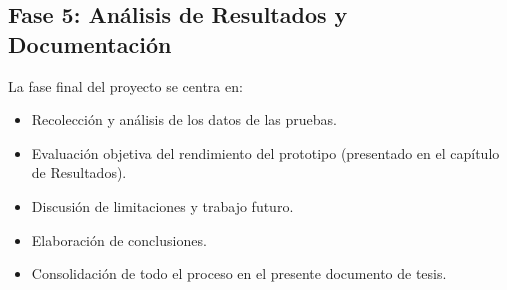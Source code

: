 \subsection{Fase 5: Análisis de Resultados y Documentación}
\label{subsec:met_fase5} 
La fase final del proyecto se centra en:
\begin{itemize}
    \item Recolección y análisis de los datos de las pruebas.
    \item Evaluación objetiva del rendimiento del prototipo (presentado en el capítulo de Resultados).
    \item Discusión de limitaciones y trabajo futuro.
    \item Elaboración de conclusiones.
    \item Consolidación de todo el proceso en el presente documento de tesis.
\end{itemize}
